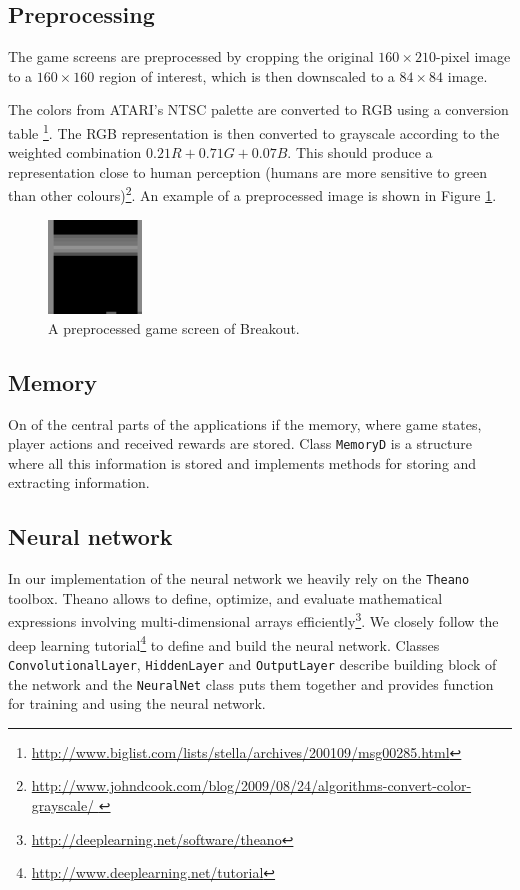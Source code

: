 \documentclass[a4paper,12pt]{article}
\begin{document}
\subsection{Preprocessing}
\label{subsection_preproc}
The game screens are preprocessed by cropping the original $160 \times 210$-pixel image to a $160 \times 160$ region of interest, which is then downscaled to a $84 \times 84$ image.

The colors from ATARI's NTSC palette are converted to RGB using a conversion table
\footnote{\url{http://www.biglist.com/lists/stella/archives/200109/msg00285.html}}. The RGB representation is then converted to grayscale according to the weighted combination $0.21R + 0.71G + 0.07B$. This should produce a representation close to human perception (humans are more sensitive to green than other colours)\footnote{\url{http://www.johndcook.com/blog/2009/08/24/algorithms-convert-color-grayscale/
}}. An example of a preprocessed image is shown in Figure \ref{fig:breakoutpreprocessed}.

\begin{figure}[h]
\centering
\includegraphics[width=2.5cm]{images/fig_preprocessedscreen.png}
\caption{A preprocessed game screen of Breakout.}
\label{fig:breakoutpreprocessed}
\end{figure}


\subsection{Memory}
On of the central parts of the applications if the memory, where game states, player actions and received rewards are stored. Class \texttt{MemoryD} is a structure where all this information is stored and implements methods for storing and extracting information.


\subsection{Neural network}
In our implementation of the neural network we heavily rely on the \texttt{Theano} toolbox. Theano allows to define, optimize, and evaluate mathematical expressions involving multi-dimensional arrays efficiently\footnote{\url{http://deeplearning.net/software/theano}}. We closely follow the deep learning tutorial\footnote{\url{http://www.deeplearning.net/tutorial}} to define and build the neural network. Classes \texttt{ConvolutionalLayer}, \texttt{HiddenLayer} and \texttt{OutputLayer} describe building block of the network and the \texttt{NeuralNet} class puts them together and provides function for training and using the neural network.
\end{document}

